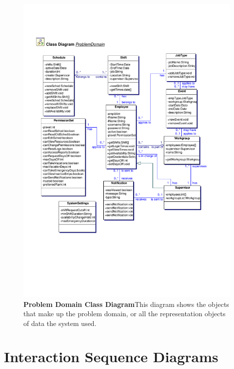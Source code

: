 \documentclass[letterpaper,12pt]{report}
\begin{document}
\begin{figure}[problemdomainClassDia]
 \centering
 \includegraphics[scale=0.7,trim=30mm 40mm 25mm 50mm]{externals/ProblemDomainClassDiagram.pdf}
 \caption{\small
\textbf{Problem Domain Class Diagram}\newline This diagram shows the objects that make up the problem domain, or all the representation objects of data the system used.}\label{fig:pdclassdia}
\end{figure}
\newpage

\clearpage
\chapter{Interaction Sequence Diagrams}
\newpage
\end{document}
